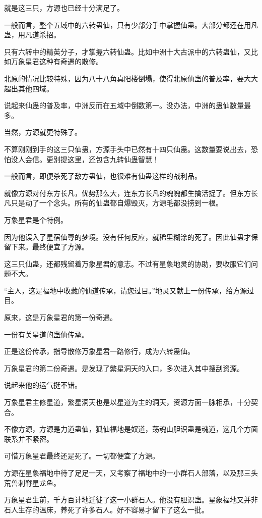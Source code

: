 \begin{this_body}
就是这三只，方源也已经十分满足了。

一般而言，整个五域中的六转蛊仙，只有少部分手中掌握仙蛊。大部分都还在用凡蛊，用凡道杀招。

只有六转中的精英分子，才掌握六转仙蛊。比如中洲十大古派中的六转蛊仙，又比如万象星君这种有奇遇的散修。

北原的情况比较特殊，因为八十八角真阳楼倒塌，使得北原仙蛊的普及率，要大大超出其他四域。

说起来仙蛊的普及率，中洲反而在五域中倒数第一。没办法，中洲的蛊仙数量最多。

当然，方源就更特殊了。

不算刚刚到手的这三只仙蛊，方源手头中已然有十四只仙蛊。这数量要说出去，恐怕没人会信。更别提这里，还包含九转仙蛊智慧！

一般而言，即便杀死了敌方蛊仙，也很难有仙蛊这样的战利品。

就像方源对付东方长凡，优势那么大，连东方长凡的魂魄都生擒活捉了。但东方长凡只是动了一个念头。所有的仙蛊都自爆毁灭，方源毛都没捞到一根。

万象星君是个特例。

因为他误入了星宿仙尊的梦境。没有任何反应，就稀里糊涂的死了。因此仙蛊才保留下来。最终便宜了方源。

这三只仙蛊，还都残留着万象星君的意志。不过有星象地灵的协助，要收服它们问题不大。

“主人，这是福地中收藏的仙道传承，请您过目。”地灵又献上一份传承，给方源过目。

原来，这是万象星君的第一份奇遇。

一份有关星道的蛊仙传承。

正是这份传承，指导散修万象星君一路修行，成为六转蛊仙。

万象星君的第二份奇遇。是发现了繁星洞天的入口，多次进入其中搜刮资源。

说起来他的运气挺不错。

万象星君主修星道，繁星洞天也是以星道为主的洞天，资源方面一脉相承，十分契合。

不像方源，方源是力道蛊仙，狐仙福地是奴道，荡魂山胆识蛊是魂道，这几个方面联系并不紧密。

可惜万象星君最终还是死了。一切都便宜了方源。

方源在星象福地中待了足足一天，又考察了福地中的一小群石人部落，以及那三头荒兽刺脊星龙鱼。

万象星君生前，千方百计地迁徙了这一小群石人。他没有胆识蛊。星象福地又并非石人生存的温床，养死了许多石人。好不容易才留下了这么一批。


\end{this_body}
